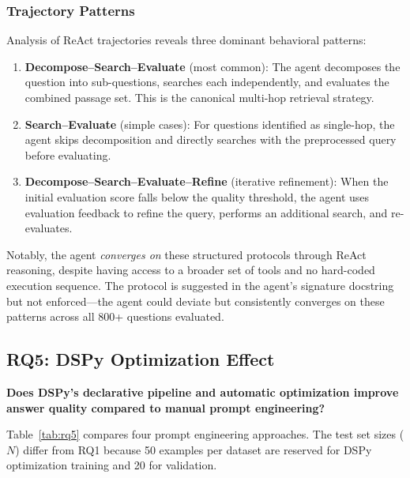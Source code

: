 \subsubsection{Trajectory Patterns}
\label{subsubsec:trajectories}

Analysis of ReAct trajectories reveals three dominant behavioral patterns:

\begin{enumerate}
    \item \textbf{Decompose--Search--Evaluate} (most common): The agent decomposes the question into sub-questions, searches each independently, and evaluates the combined passage set. This is the canonical multi-hop retrieval strategy.

    \item \textbf{Search--Evaluate} (simple cases): For questions identified as single-hop, the agent skips decomposition and directly searches with the preprocessed query before evaluating.

    \item \textbf{Decompose--Search--Evaluate--Refine} (iterative refinement): When the initial evaluation score falls below the quality threshold, the agent uses evaluation feedback to refine the query, performs an additional search, and re-evaluates.
\end{enumerate}

Notably, the agent \emph{converges on} these structured protocols through ReAct reasoning, despite having access to a broader set of tools and no hard-coded execution sequence.
The protocol is suggested in the agent's signature docstring but not enforced---the agent could deviate but consistently converges on these patterns across all 800+ questions evaluated.

\subsection{RQ5: DSPy Optimization Effect}
\label{subsec:rq5}

\textbf{Does DSPy's declarative pipeline and automatic optimization improve answer quality compared to manual prompt engineering?}

Table~\ref{tab:rq5} compares four prompt engineering approaches.
The test set sizes ($N$) differ from RQ1 because 50 examples per dataset are reserved for DSPy optimization training and 20 for validation.

